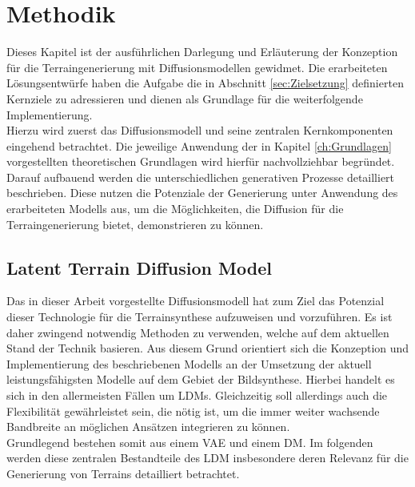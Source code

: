 \chapter{Methodik}
\label{ch:Methodik}

Dieses Kapitel ist der ausführlichen Darlegung und Erläuterung der Konzeption für die Terraingenerierung mit Diffusionsmodellen gewidmet. Die erarbeiteten Lösungsentwürfe haben die Aufgabe die in Abschnitt \ref{sec:Zielsetzung} definierten Kernziele zu adressieren und dienen als Grundlage für die weiterfolgende Implementierung. \\
Hierzu wird zuerst das Diffusionsmodell und seine zentralen Kernkomponenten eingehend betrachtet. Die jeweilige Anwendung der in Kapitel \ref{ch:Grundlagen} vorgestellten theoretischen Grundlagen wird hierfür nachvollziehbar begründet. \\
Darauf aufbauend werden die unterschiedlichen generativen Prozesse detailliert beschrieben. Diese nutzen die Potenziale der Generierung unter Anwendung des erarbeiteten Modells aus, um die Möglichkeiten, die Diffusion für die Terraingenerierung bietet, demonstrieren zu können.

\section {Latent Terrain Diffusion Model}
\label{sec:Planung_LDM}

Das in dieser Arbeit vorgestellte Diffusionsmodell hat zum Ziel das Potenzial dieser Technologie für die Terrainsynthese aufzuweisen und vorzuführen. Es ist daher zwingend notwendig Methoden zu verwenden, welche auf dem aktuellen Stand der Technik basieren. Aus diesem Grund orientiert sich die Konzeption und Implementierung des beschriebenen Modells an der Umsetzung der aktuell leistungsfähigsten Modelle auf dem Gebiet der Bildsynthese. Hierbei handelt es sich in den allermeisten Fällen um LDMs. Gleichzeitig soll allerdings auch die Flexibilität gewährleistet sein, die nötig ist, um die immer weiter wachsende Bandbreite an möglichen Ansätzen integrieren zu können.\\
Grundlegend bestehen somit aus einem \ac{VAE} und einem \ac{DM}. Im folgenden werden diese zentralen Bestandteile des LDM insbesondere deren Relevanz für die Generierung von Terrains detailliert betrachtet.

